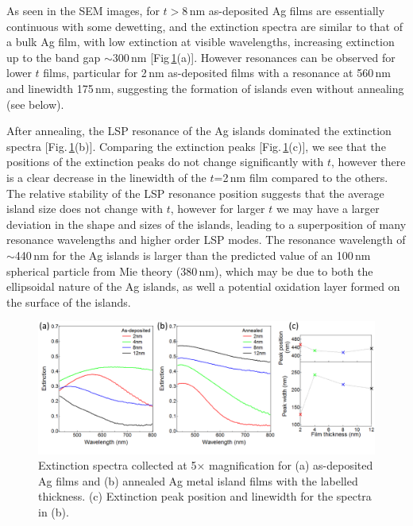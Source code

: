 As seen in the SEM images, for $t>8$\,nm as-deposited Ag films are essentially continuous with some dewetting, and the extinction spectra are similar to that of a bulk Ag film, with low extinction at visible wavelengths, increasing extinction up to the band gap $\sim300$\,nm [Fig\,\ref{6Fig6}(a)]. However resonances can be observed for lower $t$ films, particular for 2\,nm as-deposited films with a resonance at 560\,nm and linewidth 175\,nm, suggesting the formation of islands even without annealing (see below). 

After annealing, the LSP resonance of the Ag islands dominated the extinction spectra [Fig.\,\ref{6Fig6}(b)]. Comparing the extinction peaks [Fig.\,\ref{6Fig6}(c)], we see that the positions of the extinction peaks do not change significantly with $t$, however there is a clear decrease in the linewidth of the $t$=2\,nm film compared to the others. The relative stability of the LSP resonance position suggests that the average island size does not change with $t$, however for larger $t$ we may have a larger deviation in the shape and sizes of the islands, leading to a superposition of many resonance wavelengths and higher order LSP modes. The resonance wavelength of $\sim$440\,nm for the Ag islands is larger than the predicted value of an 100\,nm spherical particle from Mie theory (380\,nm), which may be due to both the ellipsoidal nature of the Ag islands, as well a potential oxidation layer formed on the surface of the islands. 
\begin{figure}[ht] 
\centering    
\includegraphics[width=\textwidth]{Fig6}
\caption{Extinction spectra collected at 5$\times$ magnification for (a) as-deposited Ag films and (b) annealed Ag metal island films with the labelled thickness. (c) Extinction peak position and linewidth for the spectra in (b).}
\label{6Fig6}
\end{figure}

